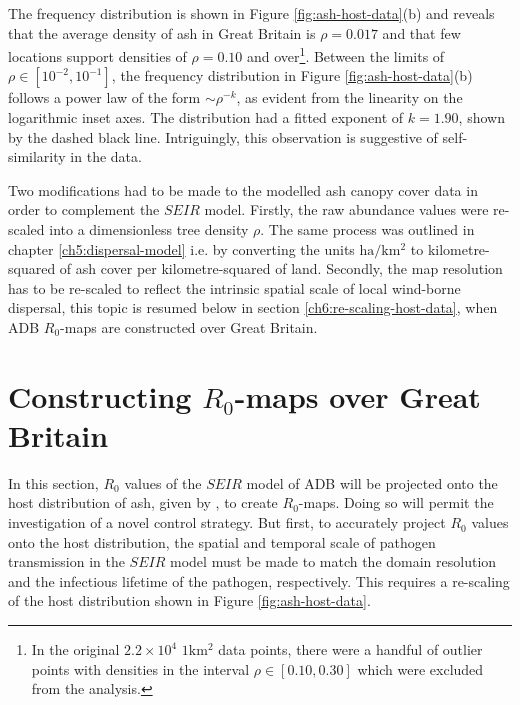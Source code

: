 The frequency distribution is shown in Figure \ref{fig:ash-host-data}(b) and reveals that the average density of ash in Great Britain is $\rho=0.017$ and that few locations support densities of $\rho=0.10$ and over\footnote{In the original $2.2\times 10^4$ $1\mathrm{km^2}$ data points, there were a handful of outlier points with densities in the interval $\rho \in [0.10, 0.30]$ which were excluded from the analysis.}. Between the limits of $\rho \in [10^{-2}, 10^{-1}]$, the frequency distribution in Figure \ref{fig:ash-host-data}(b) follows a power law of the form $\sim \rho ^{-k}$, as evident from the linearity on the logarithmic inset axes. The distribution had a fitted exponent of $k=1.90$, shown by the dashed black line. Intriguingly, this observation is suggestive of self-similarity in the data.

Two modifications had to be made to the modelled ash canopy cover data in order to complement the $SEIR$ model. Firstly, the raw abundance values were re-scaled into a dimensionless tree density $\rho$. The same process was outlined in chapter \ref{ch5:dispersal-model} i.e. by converting the units $\mathrm{ha/km^2}$ to kilometre-squared of ash cover per kilometre-squared of land. Secondly, the map resolution has to be re-scaled to reflect the intrinsic spatial scale of local wind-borne dispersal, this topic is resumed below in section \ref{ch6:re-scaling-host-data}, when ADB $R_0$-maps are constructed over Great Britain.

\section{Constructing $R_0$-maps over Great Britain}

In this section, $R_0$ values of the $SEIR$ model of ADB will be projected onto the host distribution of ash, given by \cite{hill.data}, to create $R_0$-maps. Doing so will permit the investigation of a novel control strategy. But first, to accurately project $R_0$ values onto the host distribution, the spatial and temporal scale of pathogen transmission in the $SEIR$ model must be made to match the domain resolution and the infectious lifetime of the pathogen, respectively. This requires a re-scaling of the host distribution shown in Figure \ref{fig:ash-host-data}.

